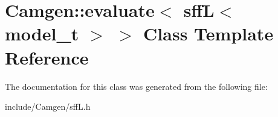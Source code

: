 \hypertarget{a00190}{\section{Camgen\-:\-:evaluate$<$ sff\-L$<$ model\-\_\-t $>$ $>$ Class Template Reference}
\label{a00190}
}


The documentation for this class was generated from the following file\-:\begin{DoxyCompactItemize}
\item 
include/\-Camgen/sff\-L.\-h\end{DoxyCompactItemize}

